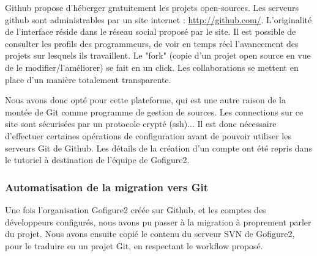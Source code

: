 Github propose d'héberger gratuitement les projets open-sources. Les serveurs github sont administrables par un site
internet : \url{http://github.com/}. L'originalité de l'interface réside dans le réseau social proposé par le site. Il est possible de consulter les profils des programmeurs, de voir en temps réel l'avancement des projets sur lesquels ils travaillent. Le "fork" (copie d'un projet open source en vue de le modifier/l'améliorer) se fait en un click. Les collaborations se mettent en place d'un manière totalement transparente.

Nous avons donc opté pour cette plateforme, qui est une autre raison de la montée de Git comme programme de gestion de sources. Les connections sur ce site sont sécurisées par un protocole crypté (ssh)... Il est donc nécessaire d'effectuer certaines opérations de configuration avant de pouvoir utiliser les serveurs Git de Github. Les détails de la création d'un compte ont été repris dans le tutoriel à destination de l'équipe de Gofigure2.

\subsubsection{Automatisation de la migration vers Git}

Une fois l'organisation Gofigure2 créée sur Github, et les comptes des développeurs configurés, nous avons pu passer à la migration à proprement parler du projet.
Nous avons ensuite copié le contenu du serveur SVN de Gofigure2,
pour le traduire en un projet Git, en respectant le workflow proposé.


